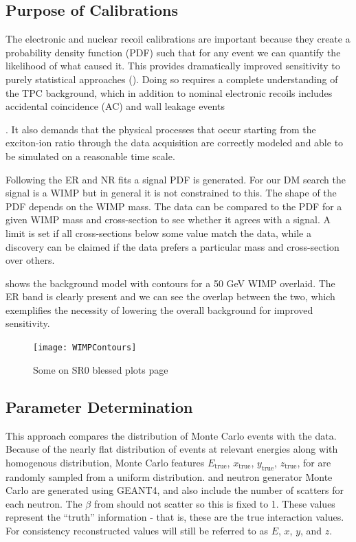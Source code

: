 {\subsection{Purpose of Calibrations}
\label{subsec:er_nr_calibrations_purpose}
The electronic and nuclear recoil calibrations are important because they create a probability density function (PDF)
such that for any event we can quantify the likelihood of what caused it.  This provides dramatically improved sensitivity
to purely statistical approaches ().  Doing so requires a complete understanding of the TPC background, which
in addition to nominal electronic recoils includes accidental coincidence (AC) and wall leakage events
}.  It also demands that
the physical processes that occur starting from the exciton-ion ratio through the data acquisition are correctly modeled and able to be
simulated on a reasonable time scale.

Following the ER and NR fits a signal PDF is generated.  For our DM search the
signal is a WIMP but in general it is not constrained to this.  The shape of the PDF depends on the WIMP mass.  The data can be compared
to the PDF for a given WIMP mass and cross-section to see whether it agrees with a signal.  A limit is set if all cross-sections below
some value match the data, while a discovery can be claimed if the data prefers a particular mass and cross-section over others.

 shows the background model with contours for a 50 GeV WIMP overlaid.  The ER band is clearly
present and we can see the overlap between the two, which exemplifies the necessity of lowering the overall background for improved
sensitivity.

\begin{figure}
\centering
\texttt{[image: WIMPContours]}
\caption{Some on SR0 blessed plots page}
\label{fig:er_nr_calibrations_wimp_contours}
\end{figure}



\subsection{Parameter Determination}
\label{subsec:er_nr_calibrations_parameter_determ}
This approach compares the distribution of Monte Carlo events with the data.  Because of the nearly flat distribution of events at relevant
energies along with homogenous distribution, Monte Carlo features $E_{\mathrm{true}}$, $x_{\mathrm{true}}$, $y_{\mathrm{true}}$,
$z_{\mathrm{true}}$, for  are randomly sampled from a
uniform distribution.   and neutron generator Monte Carlo are generated using GEANT4, and also include the number of
scatters for each neutron.  The $\beta$ from  should not scatter so this is fixed to 1.  These values represent the ``truth''
information - that is, these are the true interaction values.  For consistency reconstructed values will still be referred to as $E$, $x$,
$y$, and $z$.

